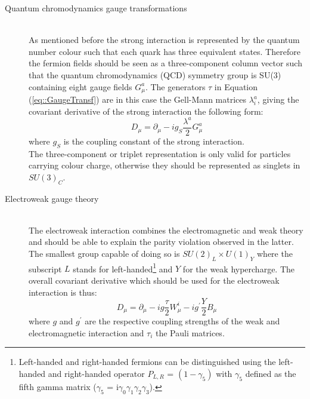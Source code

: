 \begin{myindentpar}
  \begin{description}
    \item[Quantum chromodynamics gauge transformations] \hfill \\
    As mentioned before the strong interaction is represented by the quantum number colour such that each quark has three equivalent states. Therefore the fermion fields should be seen as a three-component column vector such that the quantum chromodynamics (QCD) symmetry group is SU(3) containing eight gauge fields $G_{\mu}^{a}$. 
    The generators $\tau$ in Equation (\ref{eq::GaugeTransf}) are in this case the Gell-Mann matrices $\lambda_{i}^{a}$, giving the covariant derivative of the strong interaction the following form:
    \begin{equation}
      D_{\mu} = \partial_{\mu} - i g_{S} \frac{\lambda^{a}}{2} G_{\mu}^a
    \end{equation}
    where $g_{S}$ is the coupling constant of the strong interaction. \\
    The three-component or triplet representation is only valid for particles carrying colour charge, otherwise they should be represented as singlets in $SU(3)_{C}$. 
    
    \item[Electroweak gauge theory] \hfill \\
    The electroweak interaction combines the electromagnetic and weak theory and should be able to explain the parity violation observed in the latter. The smallest group capable of doing so is $SU(2)_{L} \times U(1)_{Y}$ where the subscript $L$ stands for left-handed\footnote{
      Left-handed and right-handed fermions can be distinguished using the left-handed and right-handed operator $P_{L,R}$ = $(1 - \gamma_{5})$ with $\gamma_5$ defined as the fifth gamma matrix ($\gamma_5$ = i$\gamma_0 \gamma_1 \gamma_2 \gamma_3$). 
    }
    and $Y$ for the weak hypercharge.
    The overall covariant derivative which should be used for the electroweak interaction is thus:
    \begin{equation}
     D_{\mu} = \partial_{\mu} - i g \frac{\tau}{2} W_{\mu}^{i} - i g^{'} \frac{Y}{2} B_{\mu}
    \end{equation}
    where $g$ and $g^{'}$ are the respective coupling strengths of the weak and electromagnetic interaction and $\tau_{i}$ the Pauli matrices. 
    

\end{description}
\end{myindentpar}
